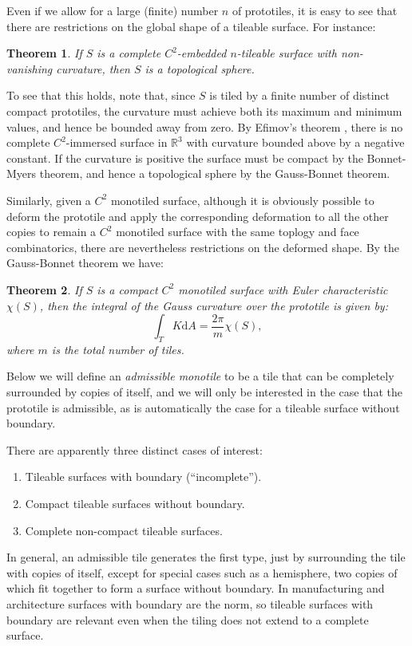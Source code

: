 \documentclass[11pt]{amsart}
\newcommand{\real}{\mathbb{R}}
\newcommand{\dd}{\mathrm{d}}
\newtheorem{theorem}{Theorem}
\theoremstyle{remark}
\newcounter{case}
\begin{document}
Even if we allow for a large (finite) number $n$ of prototiles, it is easy to see that there are restrictions on the global shape of a tileable surface. For instance:
\begin{theorem}
If $S$ is a \emph{complete} $C^2$-embedded $n$-tileable surface with non-vanishing curvature, 
then $S$ is a topological sphere.
\end{theorem}
To see that this holds, note that,  since $S$ is tiled by a finite number of distinct compact prototiles, the curvature must achieve both its maximum and minimum values, and hence be bounded away from zero.  By Efimov's theorem \cite{efimov1968hyperbolic}, there is no complete $C^2$-immersed surface in $\real^3$ with curvature bounded above by a negative constant.
If the curvature is positive  the surface must be compact by the Bonnet-Myers theorem, and hence a topological sphere by the Gauss-Bonnet theorem.  

Similarly, given a $C^2$ monotiled surface, although it is obviously possible to deform the prototile and apply the corresponding deformation to all the other copies to remain a $C^2$ monotiled surface with the same toplogy and face combinatorics, there are nevertheless restrictions on the deformed shape. By the Gauss-Bonnet theorem we have:
\begin{theorem}
If $S$ is a compact $C^2$ monotiled surface with Euler characteristic $\chi(S)$, then the integral of the Gauss curvature
over the prototile is given by:
\[
\int_T K \dd A = \frac{2\pi}{m} \chi(S),
\]
where $m$ is the total number of tiles.
\end{theorem}

Below we will define an \emph{admissible monotile} to be a tile that can be completely surrounded by copies of
itself, and we will only be interested in the case that the prototile is admissible, as is automatically the case for a tileable surface without boundary. 

There are apparently three distinct cases of interest:
\begin{enumerate}
\item Tileable surfaces with boundary (``incomplete'').
\item Compact tileable surfaces without boundary.
\item Complete non-compact tileable surfaces.
\end{enumerate}
In general, an admissible tile generates the first type, just by surrounding the tile with copies of itself, except for
special cases such as a hemisphere, two copies of which fit together to form a surface without boundary.  In manufacturing and architecture surfaces with boundary are the norm, so
tileable  surfaces with boundary are relevant even when the tiling does not extend to a complete surface.
\end{document}
